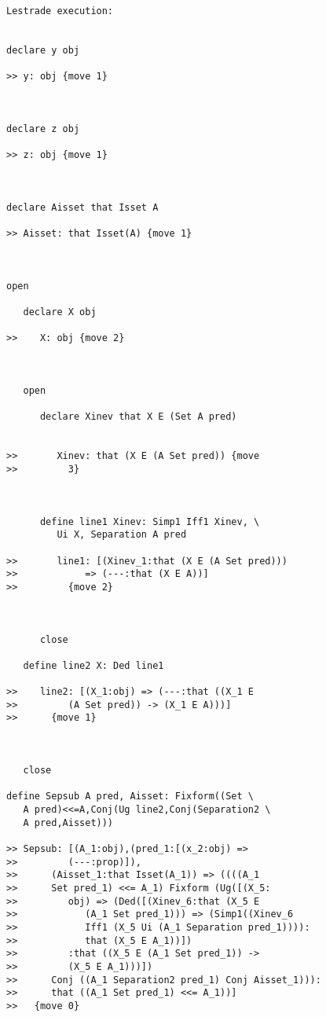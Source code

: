 \documentclass[12pt]{article}
\begin{document}
\begin{verbatim}Lestrade execution:


declare y obj

>> y: obj {move 1}



declare z obj

>> z: obj {move 1}



declare Aisset that Isset A

>> Aisset: that Isset(A) {move 1}



open

   declare X obj

>>    X: obj {move 2}



   open

      declare Xinev that X E (Set A pred)


>>       Xinev: that (X E (A Set pred)) {move
>>         3}



      define line1 Xinev: Simp1 Iff1 Xinev, \
         Ui X, Separation A pred

>>       line1: [(Xinev_1:that (X E (A Set pred)))
>>            => (---:that (X E A))]
>>         {move 2}



      close

   define line2 X: Ded line1

>>    line2: [(X_1:obj) => (---:that ((X_1 E
>>         (A Set pred)) -> (X_1 E A)))]
>>      {move 1}



   close

define Sepsub A pred, Aisset: Fixform((Set \
   A pred)<<=A,Conj(Ug line2,Conj(Separation2 \
   A pred,Aisset)))

>> Sepsub: [(A_1:obj),(pred_1:[(x_2:obj) =>
>>         (---:prop)]),
>>      (Aisset_1:that Isset(A_1)) => ((((A_1
>>      Set pred_1) <<= A_1) Fixform (Ug([(X_5:
>>         obj) => (Ded([(Xinev_6:that (X_5 E
>>            (A_1 Set pred_1))) => (Simp1((Xinev_6
>>            Iff1 (X_5 Ui (A_1 Separation pred_1)))):
>>            that (X_5 E A_1))])
>>         :that ((X_5 E (A_1 Set pred_1)) ->
>>         (X_5 E A_1)))])
>>      Conj ((A_1 Separation2 pred_1) Conj Aisset_1))):
>>      that ((A_1 Set pred_1) <<= A_1))]
>>   {move 0}


\end{verbatim}
\end{document}
